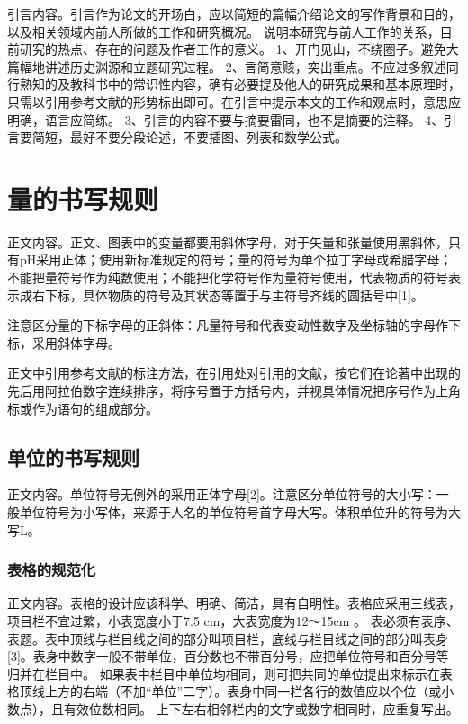 \documentclass[a4paper, zihao=5, UTF8, AutoFakeBold]{ctexart}
\begin{document}
\setlength{\parindent}{2em}

引言内容。引言作为论文的开场白，应以简短的篇幅介绍论文的写作背景和目的，以及相关领域内前人所做的工作和研究概况。
说明本研究与前人工作的关系，目前研究的热点、存在的问题及作者工作的意义。
1、开门见山，不绕圈子。避免大篇幅地讲述历史渊源和立题研究过程。
2、言简意赅，突出重点。不应过多叙述同行熟知的及教科书中的常识性内容，确有必要提及他人的研究成果和基本原理时，只需以引用参考文献的形势标出即可。在引言中提示本文的工作和观点时，意思应明确，语言应简练。
3、引言的内容不要与摘要雷同，也不是摘要的注释。
4、引言要简短，最好不要分段论述，不要插图、列表和数学公式。 

\section{量的书写规则}
正文内容。正文、图表中的变量都要用斜体字母，对于矢量和张量使用黑斜体，只有pH采用正体；使用新标准规定的符号；量的符号为单个拉丁字母或希腊字母；
不能把量符号作为纯数使用；不能把化学符号作为量符号使用，代表物质的符号表示成右下标，具体物质的符号及其状态等置于与主符号齐线的圆括号中[1]。\par
注意区分量的下标字母的正斜体：凡量符号和代表变动性数字及坐标轴的字母作下标，采用斜体字母。\par
正文中引用参考文献的标注方法，在引用处对引用的文献，按它们在论著中出现的先后用阿拉伯数字连续排序，将序号置于方括号内，并视具体情况把序号作为上角标或作为语句的组成部分。\par

\subsection{单位的书写规则}
正文内容。单位符号无例外的采用正体字母[2]。注意区分单位符号的大小写：一般单位符号为小写体，来源于人名的单位符号首字母大写。体积单位升的符号为大写L。\par

\subsubsection{表格的规范化}
正文内容。表格的设计应该科学、明确、简洁，具有自明性。表格应采用三线表，项目栏不宜过繁，小表宽度小于7.5 cm，大表宽度为12～15cm 。
表必须有表序、表题。表中顶线与栏目线之间的部分叫项目栏，底线与栏目线之间的部分叫表身[3]。表身中数字一般不带单位，百分数也不带百分号，应把单位符号和百分号等归并在栏目中。
如果表中栏目中单位均相同，则可把共同的单位提出来标示在表格顶线上方的右端（不加“单位”二字）。表身中同一栏各行的数值应以个位（或小数点），且有效位数相同。
上下左右相邻栏内的文字或数字相同时，应重复写出。
\end{document}
